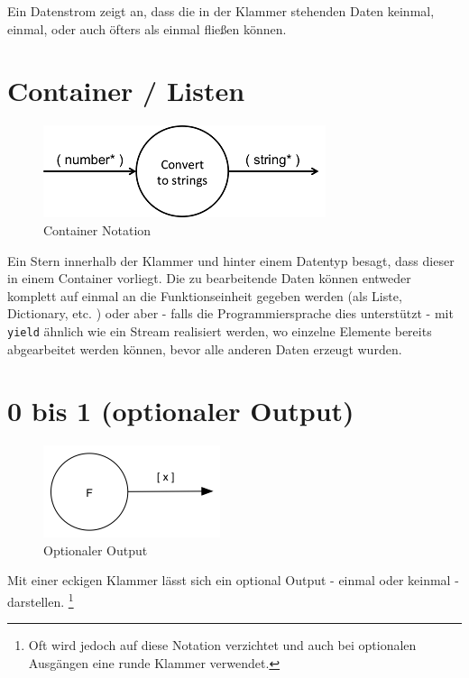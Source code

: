 Ein Datenstrom zeigt an, dass die in der Klammer stehenden Daten keinmal,
einmal, oder auch öfters als einmal fließen können.

\section{Container / Listen}


\begin{figure}[H]
	\centering
	\includegraphics[width=.7\linewidth]{./img/diagramCollection.png}
	\caption{Container Notation}
\end{figure}


Ein Stern innerhalb der Klammer und hinter einem Datentyp besagt, dass dieser in einem Container vorliegt.
Die zu bearbeitende Daten können entweder komplett auf einmal an die Funktionseinheit gegeben werden (als Liste, Dictionary, etc. )
oder aber - falls die Programmiersprache dies unterstützt - mit \texttt{yield} ähnlich wie ein Stream realisiert werden, wo einzelne Elemente bereits abgearbeitet werden können, bevor alle anderen Daten erzeugt wurden.

\section{0 bis 1 (optionaler Output)}

\begin{figure}[H]
	\centering
	\includegraphics[width=.5\linewidth]{./img/diagramOptional.png}
	\caption{Optionaler Output}
\end{figure}


Mit einer eckigen Klammer lässt sich ein optional Output - einmal oder keinmal -
darstellen. \footnote{Oft wird jedoch auf diese Notation verzichtet und auch bei optionalen Ausgängen eine runde Klammer verwendet. 
}

